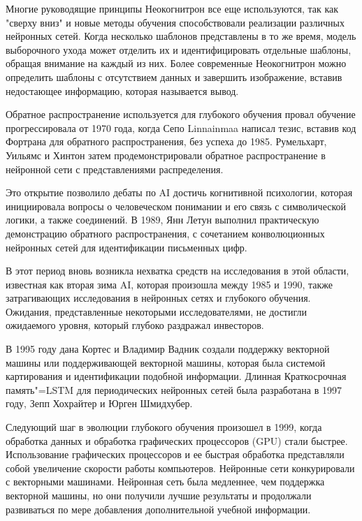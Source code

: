  Многие руководящие принципы Неокогнитрон все еще используются,
 так как "сверху вниз" и новые методы обучения способствовали реализации различных нейронных сетей.
 Когда несколько шаблонов представлены в то же время, модель выборочного ухода может отделить их и идентифицировать отдельные шаблоны, 
 обращая внимание на каждый из них. Более современные Неокогнитрон можно определить шаблоны с отсутствием данных и завершить изображение, 
 вставив недостающее информацию, которая называется вывод. 

 Обратное распространение используется для глубокого обучения провал обучение прогрессировала от 1970 года, 
 когда Сепо Linnainmaa написал тезис, вставив код Фортрана для обратного распространения, без успеха до 1985.
 Румельхарт, Уильямс и Хинтон затем продемонстрировали обратное распространение в нейронной сети с представлениями распределения. 

 Это открытие позволило дебаты по AI достичь когнитивной психологии,
 которая инициировала вопросы о человеческом понимании и его связь с символической логики, 
 а также соединений. В 1989, Янн Летун выполнил практическую демонстрацию обратного распространения,
 с сочетанием конволюционных нейронных сетей для идентификации письменных цифр.

 В этот период вновь возникла нехватка средств на исследования в этой области, известная как вторая зима AI,
 которая произошла между 1985 и 1990, также затрагивающих исследования в нейронных сетях и глубокого обучения.
 Ожидания, представленные некоторыми исследователями, не достигли ожидаемого уровня, который глубоко раздражал инвесторов. 

 В 1995 году дана Кортес и Владимир Вадник создали поддержку векторной машины или поддерживающей векторной машины, 
 которая была системой картирования и идентификации подобной информации. 
 Длинная Краткосрочная память"=LSTM для периодических нейронных сетей была разработана в 1997 году, 
 Зепп Хохрайтер и Юрген Шмидхубер.

 Следующий шаг в эволюции глубокого обучения произошел в 1999,
 когда обработка данных и обработка графических процессоров (GPU) стали быстрее. 
 Использование графических процессоров и ее быстрая обработка представляли собой увеличение скорости работы компьютеров.
 Нейронные сети конкурировали с векторными машинами. Нейронная сеть была медленнее, 
 чем поддержка векторной машины, но они получили лучшие результаты и продолжали развиваться 
 по мере добавления дополнительной учебной информации. 

